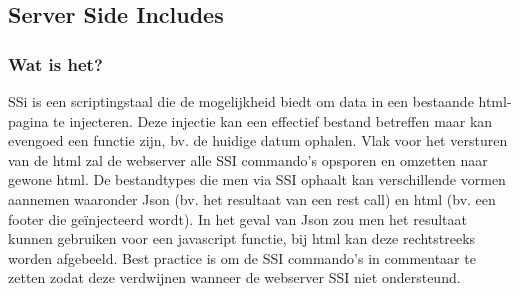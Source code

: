 \documentclass{article}
\begin{document}
	\subsection{Server Side Includes} 
	\subsubsection{Wat is het?}
	SSi is een scriptingstaal die de mogelijkheid biedt om data in een bestaande html-pagina te injecteren. Deze injectie kan een effectief bestand betreffen maar kan evengoed een functie zijn, bv. de huidige datum ophalen. Vlak voor het versturen van de html zal de webserver alle SSI commando's opsporen en omzetten naar gewone html. De bestandtypes die men via SSI ophaalt kan verschillende vormen aannemen waaronder Json (bv. het resultaat van een rest call) en html (bv. een footer die ge\"injecteerd wordt). In het geval van Json zou men het resultaat kunnen gebruiken voor een javascript functie, bij html kan deze rechtstreeks worden afgebeeld. Best practice is om de SSI commando's in commentaar te zetten zodat deze verdwijnen wanneer de webserver SSI niet ondersteund.
\end{document}
